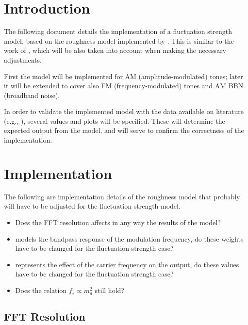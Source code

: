 \documentclass[a4paper]{article}
\begin{document}

\section{Introduction}

The following document details the implementation of a fluctuation strength
model, based on the roughness model implemented by \citet{Schrader2002}.
This is similar to the work of \citet{Sontacchi1998}, which will be also
taken into account when making the necessary adjustments.

First the model will be implemented for AM (amplitude-modulated) tones; later it
will be extended to cover also FM (frequency-modulated) tones and AM BBN
(broadband noise).

In order to validate the implemented model with the data available on literature
(e.g., \citet{Fastl2007Psychoacoustics}), several values and plots will be
specified. These will determine the expected output from the model, and will
serve to confirm the correctness of the implementation.

\section{Implementation}

The following are implementation details of the roughness model that probably
will have to be adjusted for the fluctuation strength model.

\begin{itemize}
    \item Does the FFT resolution affects in any way the results of the model?
    \item {} models the bandpass response of the modulation
        frequency, do these weights have to be changed for the fluctuation
        strength case?
    \item {} represents the effect of the carrier frequency on
        the output, do these values have to be changed for the fluctuation
        strength case?
    \item Does the relation $f_s \propto m_d ^ 2$ still hold?
\end{itemize}

\subsection{FFT Resolution}
\end{document}

